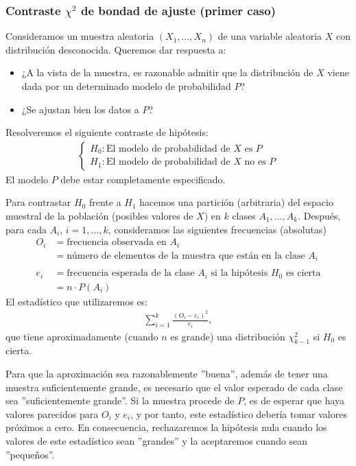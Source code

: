 \subsubsection{Contraste $\chi^2$ de bondad de ajuste (primer caso)}

Consideramos un muestra aleatoria $(X_1,\ldots, X_n)$ de una variable aleatoria $X$ con distribución desconocida. Queremos dar respuesta a:
\begin{itemize}
    \item ¿A la vista de la muestra, es razonable admitir que la distribución de $X$ viene dada por un determinado modelo de probabilidad $P$?
    \item ¿Se ajustan bien los datos a $P$?
\end{itemize}
Resolveremos el siguiente contraste de hipótesis:
\begin{align*}
    \begin{cases}
        H_0 : \text{El modelo de probabilidad de $X$ es $P$} \\
        H_1 : \text{El modelo de probabilidad de $X$ no es $P$}
    \end{cases}
\end{align*}
El modelo $P$ debe estar completamente especificado.

Para contrastar $H_0$ frente a $H_1$ hacemos una partición (arbitraria) del espacio muestral de la población (posibles valores de $X$) en $k$ clases $A_1, \ldots, A_k$. Después, para cada $A_i$, $i=1,\ldots,k$, consideramos las siguientes frecuencias (absolutas)
\begin{align*}
    O_i & = \text{frecuencia observada en $A_i$}                                         \\
        & = \text{número de elementos de la muestra que están en la clase $A_i$}         \\ \\
    e_i & = \text{frecuencia esperada de la clase $A_i$ si la hipótesis $H_0$ es cierta} \\
        & = n \cdot P(A_i)
\end{align*}
El estadístico que utilizaremos es:
\begin{align*}
    \sum_{i=1}^{k} \frac{(O_i - e_i)^2}{e_i},
\end{align*}
que tiene aproximadamente (cuando $n$ es grande) una distribución $\chi^2_{k-1}$ si $H_0$ es cierta.

Para que la aproximación sea razonablemente ''buena'', además de tener una muestra suficientemente grande, es necesario que el valor esperado de cada clase sea ''suficientemente grande''. Si la muestra procede de $P$, es de esperar que haya valores parecidos para $O_i$ y $e_i$, y por tanto, este estadístico debería tomar valores próximos a cero. En consecuencia, rechazaremos la hipótesis nula cuando los valores de este estadístico sean ''grandes'' y la aceptaremos cuando sean ''pequeños''.

